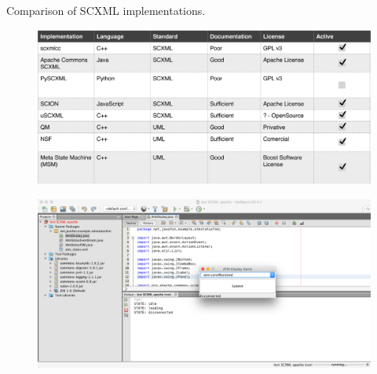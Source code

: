 \documentclass[11pt]{beamer}
\begin{document}
\begin{frame}{Comparison of SCXML implementations.}
\begin{figure}
\centering
	\includegraphics[scale=0.25]{tabla.png}
\end{figure}
\end{frame}

\begin{frame}
	\begin{figure}
		\centering
		\includegraphics[scale=0.25]{test}
	\end{figure}
\end{frame}
\end{document}

